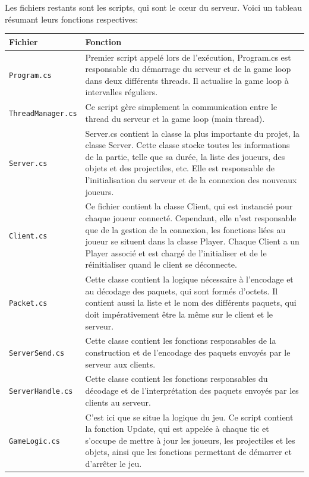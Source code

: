 \documentclass[a4paper]{article}
\begin{document}
Les fichiers restants sont les scripts, qui sont le cœur du serveur. Voici un tableau résumant leurs fonctions respectives:
\begin{center}
\begin{longtable}{|l|p{10cm}|}
    \hline
    Fichier & Fonction \\
    \hline\hline
    \texttt{Program.cs}\footnotemark[1] & Premier script appelé lors de l’exécution, Program.cs est responsable du démarrage du serveur et de la game loop dans deux différents threads. Il actualise la game loop à intervalles réguliers.\\
    \hline
    \texttt{ThreadManager.cs}\footnotemark[1] & Ce script gère simplement la communication entre le thread du serveur et la game loop (main thread).\\
    \hline
    \texttt{Server.cs}\footnotemark[1] & Server.cs contient la classe la plus importante du projet, la classe Server. Cette classe stocke toutes les informations de la partie, telle que sa durée, la liste des joueurs, des objets et des projectiles, etc. Elle est responsable de l’initialisation du serveur et de la connexion des nouveaux joueurs.\\
    \hline
    \texttt{Client.cs}\footnotemark[1] & Ce fichier contient la classe Client, qui est instancié pour chaque joueur connecté. Cependant, elle n’est responsable que de la gestion de la connexion, les fonctions liées au joueur se situent dans la classe Player. Chaque Client a un Player associé et est chargé de l'initialiser et de le réinitialiser quand le client se déconnecte.\\
    \hline
    \texttt{Packet.cs}\footnotemark[1] & Cette classe contient la logique nécessaire à l’encodage et au décodage des paquets, qui sont formés d’octets. Il contient aussi la liste et le nom des différents paquets, qui doit impérativement être la même sur le client et le serveur.\\
    \hline
    \texttt{ServerSend.cs} & Cette classe contient les fonctions responsables de la construction et de l’encodage des paquets envoyés par le serveur aux clients.\\
    \hline
    \texttt{ServerHandle.cs} & Cette classe contient les fonctions responsables du décodage et de l'interprétation des paquets envoyés par les clients au serveur.\\
    \hline
    \texttt{GameLogic.cs} & C’est ici que se situe la logique du jeu. Ce script contient la fonction Update, qui est appelée à chaque tic et s’occupe de mettre à jour les joueurs, les projectiles et les objets, ainsi que les fonctions permettant de démarrer et d'arrêter le jeu.\\

\end{longtable}
\end{center}
\end{document}
